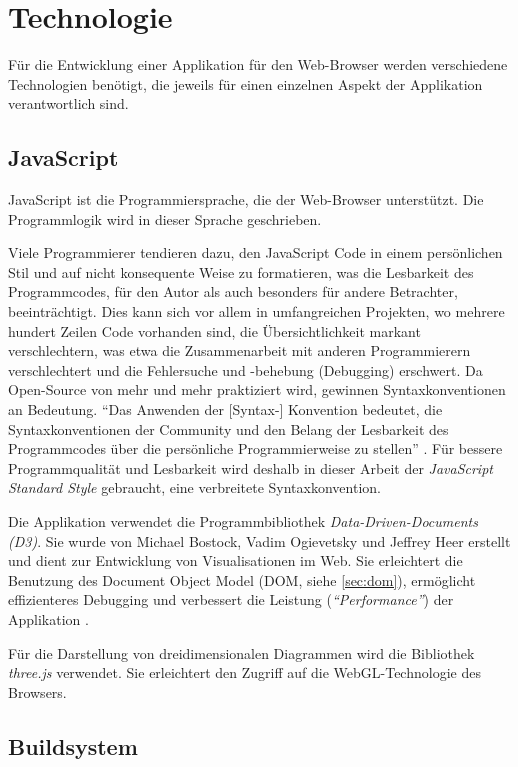 \section{Technologie}

Für die Entwicklung einer Applikation für den Web-Browser werden verschiedene Technologien benötigt, die jeweils für einen einzelnen Aspekt der Applikation verantwortlich sind.

\subsection{JavaScript}

JavaScript ist die Programmiersprache, die der Web-Browser unterstützt. Die Programmlogik wird in dieser Sprache geschrieben.

Viele Programmierer tendieren dazu, den JavaScript Code in einem persönlichen Stil und auf nicht konsequente Weise zu formatieren, was die Lesbarkeit des Programmcodes, für den Autor als auch besonders für andere Betrachter, beeinträchtigt. Dies kann sich vor allem in umfangreichen Projekten, wo mehrere hundert Zeilen Code vorhanden sind, die Übersichtlichkeit markant verschlechtern, was etwa die Zusammenarbeit mit anderen Programmierern verschlechtert und die Fehlersuche und -behebung (Debugging) erschwert. Da Open-Source von mehr und mehr praktiziert wird, gewinnen Syntaxkonventionen an Bedeutung. "`Das Anwenden der [Syntax-] Konvention bedeutet, die Syntaxkonventionen der Community und den Belang der Lesbarkeit des Programmcodes über die persönliche Programmierweise zu stellen"' \cite{feross}. Für bessere Programmqualität und Lesbarkeit wird deshalb in dieser Arbeit der \textit{JavaScript Standard Style} gebraucht, eine verbreitete Syntaxkonvention.

Die Applikation verwendet die Programmbibliothek \textit{Data-Driven-Documents (D3)}. Sie wurde von Michael Bostock, Vadim Ogievetsky und Jeffrey Heer erstellt und dient zur Entwicklung von Visualisationen im Web. Sie erleichtert die Benutzung des Document Object Model (DOM, siehe \ref{sec:dom}), ermöglicht effizienteres Debugging und verbessert die Leistung (\textit{"`Performance"'}) der Applikation \cite{bostock}.

Für die Darstellung von dreidimensionalen Diagrammen wird die Bibliothek \textit{three.js} \cite{threejs} verwendet. Sie erleichtert den Zugriff auf die WebGL-Technologie des Browsers.

\subsection{Buildsystem}

